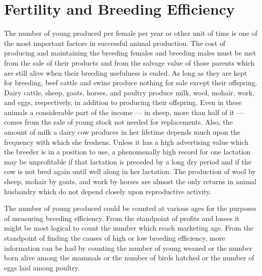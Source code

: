 \chapter{Fertility and Breeding Efficiency}
\label{cha:Lush_Chapter_38}

The number of young produced per female per year or other unit of
time is one of the most important factors in successful animal production.
The cost of producing and maintaining the breeding females and
breeding males must be met from the sale of their products and from
the salvage value of those parents which are still alive when their breeding
usefulness is ended. As long as they are kept for breeding, beef cattle
and swine produce nothing for sale except their offspring. Dairy
cattle, sheep, goats, horses, and poultry produce milk, wool, mohair,
work, and eggs, respectively, in addition to producing their offspring.
Even in these animals a considerable part of the income --- in sheep,
more than half of it --- comes from the sale of young stock not needed for
replacements. Also, the amount of milk a dairy cow produces in her
lifetime depends much upon the frequency with which she freshens.
Unless it has a high advertising value which the breeder is in a position
to use, a phenomenally high record for one lactation may be unprofitable
if that lactation is preceded by a long dry period and if the cow is
not bred again until well along in her lactation. The production of
wool by sheep, mohair by goats, and work by horses are almost the only
returns in animal husbandry which do not depend closely upon reproductive
activity.

The number of young produced could be counted at various ages
for the purposes of measuring breeding efficiency. From the standpoint
of profits and losses it might be most logical to count the number which
reach marketing age. From the standpoint of finding the causes of high
or low breeding efficiency, more information can be had by counting
the number of young weaned or the number born alive among the
mammals or the number of birds hatched or the number of eggs laid
among poultry.

